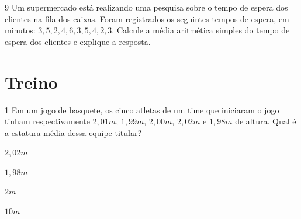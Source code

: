 










\num{9} Um supermercado está realizando uma pesquisa sobre o tempo de espera
dos clientes na fila dos caixas. Foram registrados os seguintes tempos
de espera, em minutos: $3, 5, 2, 4, 6, 3, 5, 4, 2, 3$.
Calcule a média aritmética simples do tempo de espera dos clientes e
explique a resposta.






\section*{Treino}

\num{1} Em um jogo de basquete, os cinco atletas de um time que iniciaram o jogo
tinham respectivamente $2,01 m$, $1,99 m$, $2,00 m$, $2,02 m$ e $1,98 m$ de
altura. Qual é a estatura média dessa equipe titular?

\begin{escolha}[itemsep=0pt]
\item $2,02 m$
\item $1,98 m$
\item $2 m$
\item $10 m$
\end{escolha}

